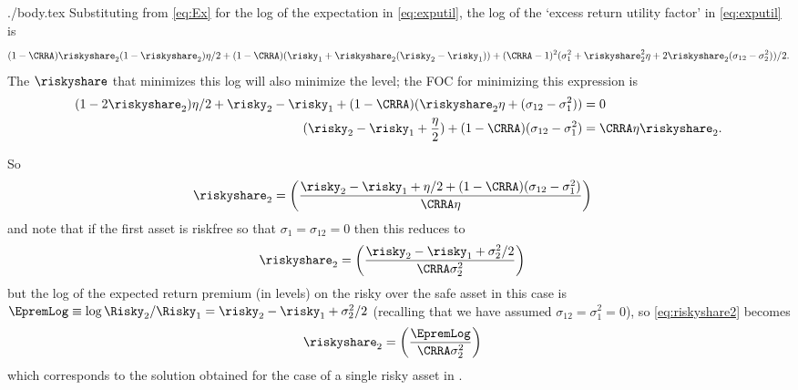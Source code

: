 \documentclass{handout}
\begin{document}
\begin{verbatimwrite}{./body.tex}
Substituting from \eqref{eq:Ex} for the log of the expectation in \eqref{eq:exputil},
the log of the `excess return utility factor' in \eqref{eq:exputil} is
\begin{equation*}
  (1-\CRRA)\riskyshare_2(1-\riskyshare_2)\eta/2+(1-\CRRA) (\risky_1+\riskyshare_2(\risky_2-\risky_1))+(\CRRA-1)^2 (\sigma_1^2+\riskyshare_2^2 \eta+2\riskyshare_2(\sigma_{12}-\sigma_2^2))/2
.
\end{equation*}
The $\riskyshare$ that minimizes this log will also minimize the level; the FOC
for minimizing this expression is
\begin{equation}\begin{gathered}\begin{aligned}
         (1-2\riskyshare_2)\eta/2+ \risky_2-\risky_1+(1-\CRRA) (\riskyshare_2 \eta+(\sigma_{12}-\sigma_1^2)) & =  0 \\
         \quad(\risky_2-\risky_1+\frac{\eta}{2})+(1-\CRRA) (\sigma_{12}-\sigma_1^2) & = \CRRA \eta \riskyshare_2.
         \label{eq:riskyshareMS}
\end{aligned}\end{gathered}\end{equation}

So
\begin{equation}\begin{gathered}\begin{aligned}
\riskyshare_2 & =  \left(\frac{\risky_2-\risky_1+\eta/2+(1-\CRRA)(\sigma_{12}-\sigma_1^2)}{\CRRA\eta}\right)
\end{aligned}\end{gathered}\end{equation}
and note that if the first asset is riskfree so that $\sigma_{1}=\sigma_{12}=0$ then this reduces to 
\begin{equation}\begin{gathered}\begin{aligned}
\riskyshare_2 & =  \left(\frac{\risky_2-\risky_1+\sigma^{2}_{2}/2}{\CRRA\sigma^{2}_{2}}\right) \label{eq:riskyshare2}
\end{aligned}\end{gathered}\end{equation}
but the log of the expected return premium (in levels) on the risky over the safe asset in this case is $\EpremLog \equiv \log \Risky_{2}/\Risky_{1} = \risky_{2}-\risky_{1}+\sigma^{2}_{2}/2$
(recalling that we have assumed $\sigma_{12}=\sigma^{2}_{1}=0$), so \eqref{eq:riskyshare2} becomes 
\begin{equation}\begin{gathered}\begin{aligned}
\riskyshare_2 & =  \left(\frac{\EpremLog}{\CRRA\sigma^{2}_{2}}\right)
\end{aligned}\end{gathered}\end{equation}
which corresponds to the solution obtained for the case of a single risky asset in .


\end{verbatimwrite}



\end{document}
